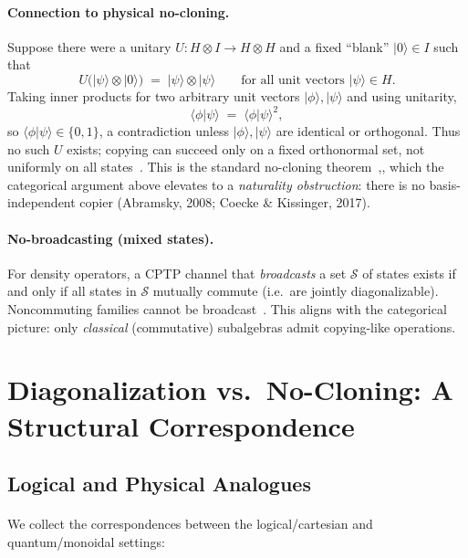 \documentclass[11pt]{article}
\theoremstyle{upright}
\begin{document}
\paragraph{Connection to physical no-cloning.}
Suppose there were a unitary $U : H\otimes I \to H\otimes H$ and a fixed ``blank'' $|0\rangle\in I$ such that
\begin{equation}\label{eq:unitary-clone}
U\big(|\psi\rangle \otimes |0\rangle\big) \;=\; |\psi\rangle \otimes |\psi\rangle
\qquad \text{for all unit vectors }|\psi\rangle\in H.
\end{equation}
Taking inner products for two arbitrary unit vectors $|\phi\rangle,|\psi\rangle$ and using unitarity,
\[
\langle \phi|\psi\rangle \;=\; \big\langle \phi|\psi\big\rangle^2,
\]
so $\langle \phi|\psi\rangle \in \{0,1\}$, a contradiction unless $|\phi\rangle,|\psi\rangle$ are identical or orthogonal. Thus no such $U$ exists; copying can succeed only on a fixed orthonormal set, not uniformly on all states~\cite{WoottersZurek1982}. This is the standard no-cloning theorem~\cite{WoottersZurek1982,Dieks1982},, which the categorical argument above elevates to a \emph{naturality obstruction}: there is no basis-independent copier (Abramsky, 2008; Coecke \& Kissinger, 2017).

\paragraph{No-broadcasting (mixed states).}
For density operators, a CPTP channel that \emph{broadcasts} a set $\mathcal{S}$ of states exists if and only if all states in $\mathcal{S}$ mutually commute (i.e.\ are jointly diagonalizable). Noncommuting families cannot be broadcast~\cite{BarnumEtAl1996}. This aligns with the categorical picture: only \emph{classical} (commutative) subalgebras admit copying-like operations.

\section{Diagonalization vs.\ No-Cloning: A Structural Correspondence}
\label{sec:diag-nocloning}

\subsection{Logical and Physical Analogues}

\paragraph{}
We collect the correspondences between the logical/cartesian and quantum/monoidal settings:
\end{document}
